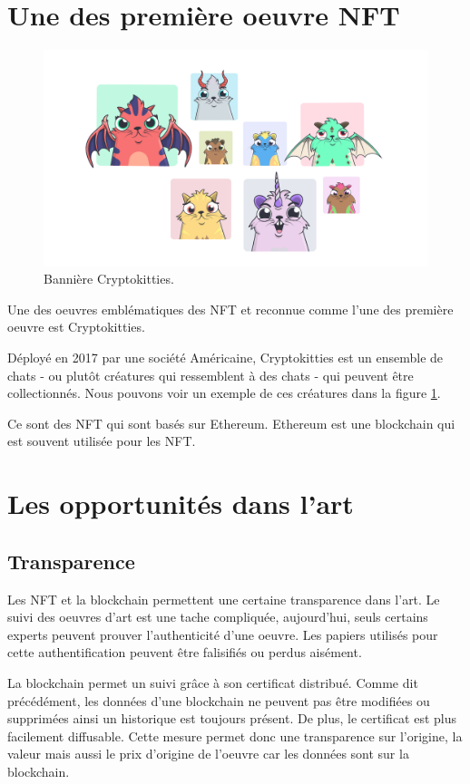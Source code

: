 \documentclass[11pt]{article}
\begin{document}
\section{Une des première oeuvre NFT} %
\begin{figure}
\centering
\includegraphics[width=1\textwidth]{press pack_v2-33.jpg}
\caption{\label{fig:Cryptokitties}Bannière Cryptokitties.}
\end{figure}
Une des oeuvres emblématiques des NFT et reconnue comme l'une des première oeuvre est Cryptokitties. 

Déployé en 2017 par une société Américaine, Cryptokitties est un ensemble de chats - ou plutôt créatures qui ressemblent à des chats - qui peuvent être collectionnés. Nous pouvons voir un exemple de ces créatures dans la figure  \ref{fig:Cryptokitties}. 

Ce sont des NFT qui sont basés sur Ethereum. Ethereum est une blockchain qui est souvent utilisée pour les NFT.

\section{Les opportunités dans l'art} %
\subsection{Transparence} %
Les NFT et la blockchain permettent une certaine transparence dans l'art. 
Le suivi des oeuvres d'art est une tache compliquée, aujourd'hui, seuls certains experts peuvent prouver l'authenticité d'une oeuvre. Les papiers utilisés pour cette authentification peuvent être falisifiés ou perdus aisément. 

La blockchain permet un suivi grâce à son certificat distribué. Comme dit précédément, les données d'une blockchain ne peuvent pas être modifiées ou supprimées ainsi un historique est toujours présent. De plus, le certificat est plus facilement diffusable. Cette mesure permet donc une transparence sur l'origine, la valeur mais aussi le prix d'origine de l'oeuvre car les données sont sur la blockchain. 
\end{document}
